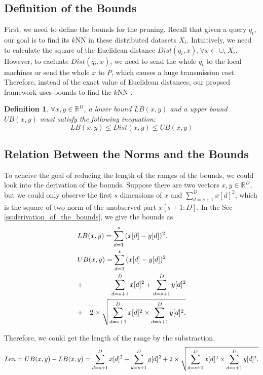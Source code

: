 
\subsection{Definition of the Bounds} %
\label{ss:definition_of_the_bounds}

First, we need to define the bounds for the pruning.  Recall that given a query $q_t$, our goal is to find its $k$NN in these distributed datasets $X_i$.  Intuitively, we need to calculate the square of the Euclidean distance $Dist(q_t,x), \forall x\in \cup_i X_i$.  However, to cacluate $Dist(q_t,x)$, we need to send the whole $q_t$ to the local machines or send the whole $x$ to $P$, which causes a huge transmission cost.  Therefore, instead of the exact value of Euclidean distances, our propsed framework uses bounds to find the $k$NN .

\newtheorem{Bounds}{\bf Definition}
\begin{Bounds}
$\forall x,y \in \mathbb{R}^D$, a lower bound $LB(x,y)$ and a upper bound $UB(x,y)$ must satisfy the following inequation:
\[
LB(x,y)\leq Dist(x,y) \leq UB(x,y)
\]
\end{Bounds}

\subsection{Relation Between the Norms and the Bounds} %
\label{sub:relation_between_the_norms_and_the_bounds}

To acheive the goal of reducing the length of the ranges of the bounds, we could look into the derivation of the bounds. Suppose there are two vectors $x,y\in \mathbb{R}^D$, but we could only observe the first $s$ dimensions of $x$ and $\sum^D_{d=s+1}{x[d]^2}$, which is the square of two norm of the unobserved part $x[s+1:D]$.  In the Sec \ref{ss:derivation_of_the_bounds}, we give the bounds as 
{
\begin{eqnarray*}
\lefteqn{LB(x,y) = \sum^s_{d=1}{(x[d]-y[d])^2}.} \label{eq:single-LB-tmp} \\
\lefteqn{UB(x,y) = \sum^s_{d=1}{(x[d]-y[d])^2}} \notag \\
& + & \sum^D_{d=s+1}{x[d]^2}+\sum^D_{d=s+1}{y[d]^2} \notag \\
& + & 2 \times \sqrt{\sum^D_{d=s+1}{x[d]^2}\times \sum^D_{d=s+1}{y[d]^2}.}\label{eq:single-UB-tmp}
\end{eqnarray*}
}

Therefore, we could get the length of the range by the substraction.
\[
Len = UB(x,y) - LB(x,y) = \sum^D_{d=s+1}{x[d]^2}+\sum^D_{d=s+1}{y[d]^2} \notag \\
 +  2 \times \sqrt{\sum^D_{d=s+1}{x[d]^2}\times \sum^D_{d=s+1}{y[d]^2}.}\label{eq:len-range}
\]


